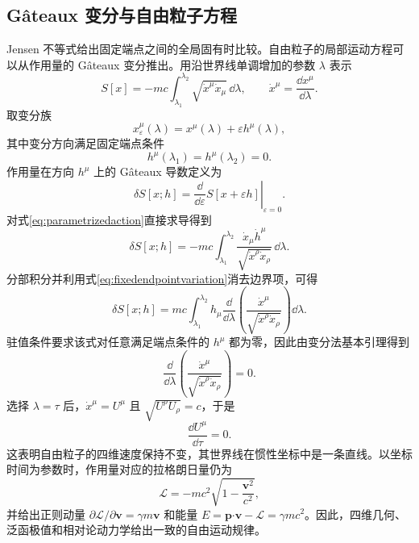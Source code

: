 \documentclass[style=classic,color=full]{lc-article}
\begin{document}
\subsection{G\^ateaux 变分与自由粒子方程}

Jensen 不等式给出固定端点之间的全局固有时比较。自由粒子的局部运动方程可以从作用量的 G\^ateaux 变分推出。用沿世界线单调增加的参数 $\lambda$ 表示
\begin{equation}
  S[x]=-mc\int_{\lambda_1}^{\lambda_2}
  \sqrt{\dot x^\mu\dot x_\mu}\,\dd\lambda,
  \qquad
  \dot x^\mu=\frac{\dd x^\mu}{\dd\lambda}.
  \label{eq:parametrizedaction}
\end{equation}
取变分族
\begin{equation}
  x_\varepsilon^\mu(\lambda)
  =x^\mu(\lambda)+\varepsilon h^\mu(\lambda),
\end{equation}
其中变分方向满足固定端点条件
\begin{equation}
  h^\mu(\lambda_1)=h^\mu(\lambda_2)=0.
  \label{eq:fixedendpointvariation}
\end{equation}
作用量在方向 $h^\mu$ 上的 G\^ateaux 导数定义为
\begin{equation}
  \delta S[x;h]
  =\left.\frac{\dd}{\dd\varepsilon}
  S[x+\varepsilon h]\right|_{\varepsilon=0}.
  \label{eq:gateauxdefinition}
\end{equation}
对式\eqref{eq:parametrizedaction}直接求导得到
\begin{equation}
  \delta S[x;h]
  =-mc\int_{\lambda_1}^{\lambda_2}
  \frac{\dot x_\mu\dot h^\mu}
  {\sqrt{\dot x^\rho\dot x_\rho}}\,\dd\lambda.
\end{equation}
分部积分并利用式\eqref{eq:fixedendpointvariation}消去边界项，可得
\begin{equation}
  \delta S[x;h]
  =mc\int_{\lambda_1}^{\lambda_2}
  h_\mu\frac{\dd}{\dd\lambda}
  \left(
    \frac{\dot x^\mu}
    {\sqrt{\dot x^\rho\dot x_\rho}}
  \right)\dd\lambda.
\end{equation}
驻值条件要求该式对任意满足端点条件的 $h^\mu$ 都为零，因此由变分法基本引理得到
\begin{equation}
  \frac{\dd}{\dd\lambda}
  \left(
    \frac{\dot x^\mu}
    {\sqrt{\dot x^\rho\dot x_\rho}}
  \right)=0.
  \label{eq:freeparticleparameter}
\end{equation}
选择 $\lambda=\tau$ 后，$\dot x^\mu=U^\mu$ 且 $\sqrt{U^\rho U_\rho}=c$，于是
\begin{equation}
  \boxed{\frac{\dd U^\mu}{\dd\tau}=0.}
  \label{eq:freeparticleequation}
\end{equation}
这表明自由粒子的四维速度保持不变，其世界线在惯性坐标中是一条直线。以坐标时间为参数时，作用量对应的拉格朗日量仍为
\begin{equation}
  \mathcal L=-mc^2\sqrt{1-\frac{\bm v^2}{c^2}},
\end{equation}
并给出正则动量 $\partial\mathcal L/\partial\bm v=\gamma m\bm v$ 和能量 $E=\bm p\mathbin{\bm\cdot}\bm v-\mathcal L=\gamma mc^2$。因此，四维几何、泛函极值和相对论动力学给出一致的自由运动规律\cite{landau,rindler}。
\end{document}
